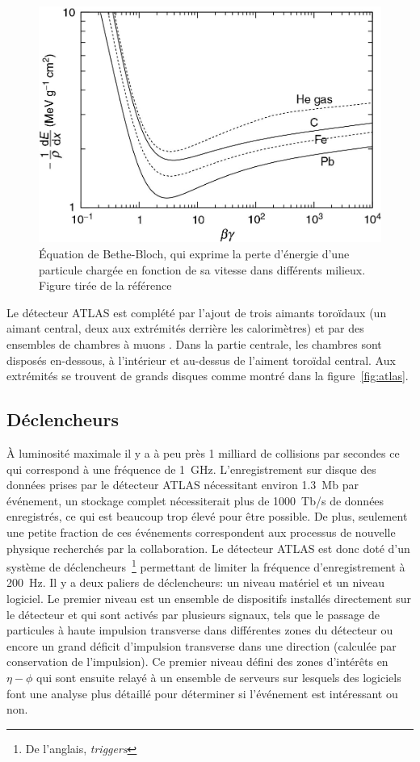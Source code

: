 \begin{figure}
  \centering
  \includegraphics{bethe_bloch.jpg}
  \caption{Équation de Bethe-Bloch, qui exprime la perte d'énergie
    d'une particule chargée en fonction de sa vitesse dans différents
    milieux. Figure tirée de la référence~\cite{thomson_modern_2013}}
  \label{fig:bethe-bloch}
\end{figure}

Le détecteur ATLAS est complété par l'ajout de trois aimants toroïdaux
(un aimant central, deux aux extrémités derrière les calorimètres) et
par des ensembles de chambres à muons . Dans la partie centrale, les
chambres sont disposés en-dessous, à l'intérieur et au-dessus de
l'aiment toroïdal central. Aux extrémités se trouvent de grands
disques comme montré dans la figure~\ref{fig:atlas}.

\subsection{Déclencheurs}
\label{sec:lhc_atlas:atlas:daq}

À luminosité maximale il y a à peu près 1 milliard de collisions par
secondes ce qui correspond à une fréquence de 1~GHz. L'enregistrement
sur disque des données prises par le détecteur ATLAS nécessitant
environ 1.3~Mb par événement, un stockage complet nécessiterait plus
de 1000~Tb/s de données enregistrés, ce qui est beaucoup trop élevé
pour être possible. De plus, seulement une petite fraction de ces
événements correspondent aux processus de nouvelle physique recherchés
par la collaboration. Le détecteur ATLAS est donc doté d'un système de
déclencheurs~\footnote{De l'anglais, \emph{triggers}} permettant de
limiter la fréquence d'enregistrement à 200~Hz. Il y a deux paliers de
déclencheurs: un niveau matériel et un niveau logiciel. Le premier
niveau est un ensemble de dispositifs installés directement sur le
détecteur et qui sont activés par plusieurs signaux, tels que le
passage de particules à haute impulsion transverse dans différentes
zones du détecteur ou encore un grand déficit d'impulsion transverse
dans une direction (calculée par conservation de l'impulsion). Ce
premier niveau défini des zones d'intérêts en $\eta-\phi$ qui sont
ensuite relayé à un ensemble de serveurs sur lesquels des logiciels
font une analyse plus détaillé pour déterminer si l'événement est
intéressant ou non.

